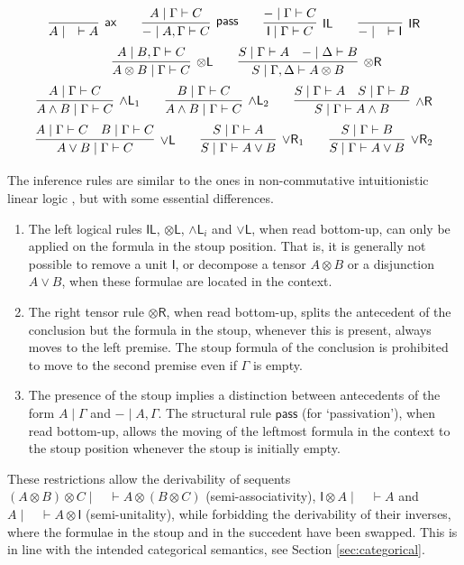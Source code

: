 \documentclass[submission,copyright,creativecommons]{eptcs}
\theoremstyle{definition}
\newcommand{\tl}{\otimes \mathsf{L}}
\newcommand{\tr}{\otimes \mathsf{R}}
\newcommand{\pass}{\mathsf{pass}}
\newcommand{\unitl}{\mathsf{IL}}
\newcommand{\unitr}{\mathsf{IR}}
\newcommand{\andlone}{\land \mathsf{L}_{1}}
\newcommand{\andltwo}{\land \mathsf{L}_{2}}
\newcommand{\andli}{\land \mathsf{L}_{i}}
\newcommand{\andr}{\land \mathsf{R}}
\newcommand{\orl}{\lor \mathsf{L}}
\newcommand{\orrone}{\lor \mathsf{R}_{1}}
\newcommand{\orrtwo}{\lor \mathsf{R}_{2}}
\newcommand{\ax}{\mathsf{ax}}
\newcommand{\ot}{\otimes}
\newcommand{\I}{\mathsf{I}}
\begin{document}
\begin{equation}\label{eq:seqcalc}
  \def\arraystretch{2.5}
  \begin{array}{c}
    \infer[\ax]{A \mid \quad \vdash A}{}
    \qquad
    \infer[\pass]{{-} \mid A , \Gamma \vdash C}{A \mid \Gamma \vdash C}
    \qquad
    \infer[\unitl]{\I \mid \Gamma \vdash C}{{-} \mid \Gamma \vdash C}
    \qquad
    \infer[\unitr]{{-} \mid \quad \vdash \I}{}
    \\
    \qquad
    \infer[\tl]{A \ot B \mid \Gamma \vdash C}{A \mid B , \Gamma \vdash C}
    \qquad
    \infer[\tr]{S \mid \Gamma , \Delta \vdash A \ot B}{
      S \mid \Gamma \vdash A
      &
      {-} \mid \Delta \vdash B
    }
    \\
    \infer[\andlone]{A \land B \mid \Gamma \vdash C}{A \mid \Gamma \vdash C}
    \qquad
    \infer[\andltwo]{A \land B \mid \Gamma \vdash C}{B \mid \Gamma \vdash C}
    \qquad
    \infer[\andr]{S \mid \Gamma \vdash A \land B}{
      S \mid \Gamma \vdash A
      &
      S \mid \Gamma \vdash B
    }
    \\
    \infer[\orl]{A \lor B \mid \Gamma \vdash C}{
      A \mid \Gamma \vdash C
      &
      B \mid \Gamma \vdash C
    }
    \qquad
    \infer[\orrone]{S \mid \Gamma \vdash A \lor B}{S \mid \Gamma \vdash A}
    \qquad
    \infer[\orrtwo]{S \mid \Gamma \vdash A \lor B}{S \mid \Gamma \vdash B}
  \end{array}
\end{equation}
The inference rules are similar to the ones in non-commutative intuitionistic linear logic \cite{abrusci:noncommutative:1990}, but with some essential differences. 
\begin{enumerate}
\item The left logical rules $\unitl$, $\tl$, $\andli$ and $\orl$, when read bottom-up, can only be applied on the formula in the stoup position. 
That is, it is generally not possible to remove a unit $\I$, or decompose a tensor $A \ot B$ or a disjunction $A \lor B$, when these formulae are located in the context.
\item The right tensor rule $\tr$, when read bottom-up, splits the antecedent of the conclusion but the formula in the stoup, whenever this is present, always moves to the left premise.
The stoup formula of the conclusion is prohibited to move to the second premise even if $\Gamma$ is empty. 
\item The presence of the stoup implies a distinction between antecedents of the form $A \mid \Gamma$ and ${-} \mid A, \Gamma$. The structural rule $\pass$ (for `passivation'), when read bottom-up, allows the moving of the leftmost formula in the context to the stoup position whenever the stoup is initially empty.
\end{enumerate}
These restrictions allow the derivability of sequents $(A \ot B) \ot C \mid \quad\vdash A \ot (B\ot C)$ (semi-associativity), $\I \ot A \mid \quad \vdash A$ and $A \mid \quad \vdash A \ot \I$ (semi-unitality), while forbidding the derivability of their inverses, where the formulae in the stoup and in the succedent have been swapped. This is in line with the intended categorical semantics, see Section \ref{sec:categorical}.
\end{document}
